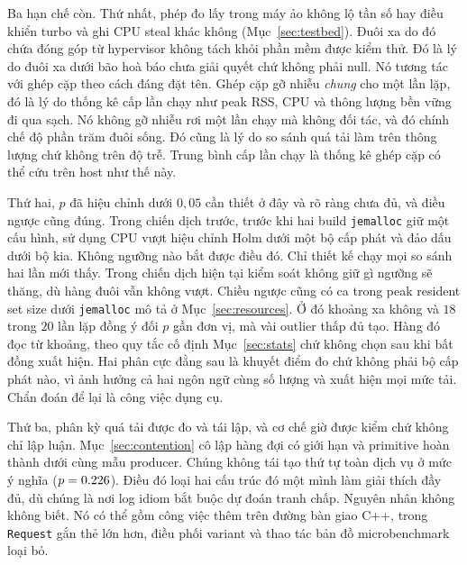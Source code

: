 Ba hạn chế còn. Thứ nhất, phép đo lấy trong máy ảo
không lộ tần số hay điều khiển turbo và ghi CPU steal khác không
(Mục~\ref{sec:testbed}). Đuôi xa do đó chứa đóng góp từ hypervisor
không tách khỏi phần mềm được kiểm thử. Đó là lý do đuôi xa dưới bão hoà
báo chưa giải quyết chứ không phải null. Nó tương tác với ghép cặp theo cách đáng đặt tên.
Ghép cặp gỡ nhiễu \emph{chung} cho một lần lặp, đó là lý do thống kê cấp lần chạy như peak RSS, CPU và thông lượng bền vững đi qua sạch. Nó không
gỡ nhiễu rơi một lần chạy mà không đối tác, và đó chính chế độ
phần trăm đuôi sống. Đó cũng là lý do so sánh quá tải làm trên thông lượng chứ không
trên độ trễ. Trung bình cấp lần chạy là thống kê ghép cặp có thể cứu trên host như thế này.

Thứ hai, $p$ đã hiệu chỉnh dưới $0{,}05$ cần thiết ở đây và rõ ràng chưa đủ, và
điều ngược cũng đúng. Trong chiến dịch trước, trước khi hai build \texttt{jemalloc} giữ
một cấu hình, sử dụng CPU vượt hiệu chỉnh Holm dưới một bộ cấp phát và đảo dấu
dưới bộ kia. Không ngưỡng nào bắt được điều đó. Chỉ thiết kế
chạy mọi so sánh hai lần mới thấy. Trong chiến dịch hiện tại kiểm soát không giữ
gì ngưỡng sẽ thăng, dù hàng đuôi vẫn không vượt. Chiều ngược cũng có ca
trong peak resident set size dưới \texttt{jemalloc} mô tả ở
Mục~\ref{sec:resources}. Ở đó khoảng xa không và $18$ trong $20$ lần lặp đồng ý
đối $p$ gần đơn vị, mà vài outlier thấp đủ tạo. Hàng đó
đọc từ khoảng, theo quy tắc cố định Mục~\ref{sec:stats} chứ không chọn sau khi
bất đồng xuất hiện. Hai phân cực đằng sau là khuyết điểm đo chứ không phải
bộ cấp phát nào, vì ảnh hưởng cả hai ngôn ngữ cùng số lượng và xuất hiện mọi mức
tải. Chẩn đoán để lại là công việc dụng cụ.

Thứ ba, phân kỳ quá tải được đo và tái lập, và cơ chế giờ được kiểm chứ không
chỉ lập luận. Mục~\ref{sec:contention} cô lập hàng đợi có giới hạn và
primitive hoàn thành dưới cùng mẫu \ContentionProducers{} producer. Chúng không tái tạo thứ tự toàn dịch vụ
ở mức ý nghĩa ($p = 0.226$). Điều đó loại hai cấu trúc đó một mình làm giải thích
đầy đủ, dù chúng là nơi log idiom bắt buộc dự đoán tranh chấp. Nguyên nhân
không không biết. Nó có thể gồm công việc thêm trên đường bàn giao C++, trong
\texttt{Request} gắn thẻ lớn hơn, điều phối variant và thao tác bản đồ microbenchmark loại bỏ.

